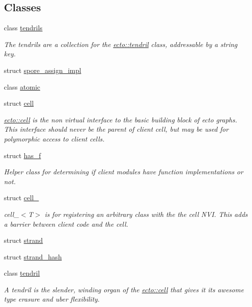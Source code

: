 \subsection*{Classes}
\begin{DoxyCompactItemize}
\item 
class \hyperlink{classecto_1_1tendrils}{tendrils}
\begin{DoxyCompactList}\small\item\em The tendrils are a collection for the \hyperlink{classecto_1_1tendril}{ecto\-::tendril} class, addressable by a string key. \end{DoxyCompactList}\item 
struct \hyperlink{structecto_1_1spore__assign__impl}{spore\-\_\-assign\-\_\-impl}
\item 
class \hyperlink{classecto_1_1atomic}{atomic}
\item 
struct \hyperlink{structecto_1_1cell}{cell}
\begin{DoxyCompactList}\small\item\em \hyperlink{structecto_1_1cell}{ecto\-::cell} is the non virtual interface to the basic building block of ecto graphs. This interface should never be the parent of client cell, but may be used for polymorphic access to client cells. \end{DoxyCompactList}\item 
struct \hyperlink{structecto_1_1has__f}{has\-\_\-f}
\begin{DoxyCompactList}\small\item\em Helper class for determining if client modules have function implementations or not. \end{DoxyCompactList}\item 
struct \hyperlink{structecto_1_1cell__}{cell\-\_\-}
\begin{DoxyCompactList}\small\item\em cell\-\_\-$<$\-T$>$ is for registering an arbitrary class with the the cell N\-V\-I. This adds a barrier between client code and the cell. \end{DoxyCompactList}\item 
struct \hyperlink{structecto_1_1strand}{strand}
\item 
struct \hyperlink{structecto_1_1strand__hash}{strand\-\_\-hash}
\item 
class \hyperlink{classecto_1_1tendril}{tendril}
\begin{DoxyCompactList}\small\item\em A tendril is the slender, winding organ of the \hyperlink{structecto_1_1cell}{ecto\-::cell} that gives it its awesome type erasure and uber flexibility. \end{DoxyCompactList}\item 

\end{DoxyCompactItemize}
